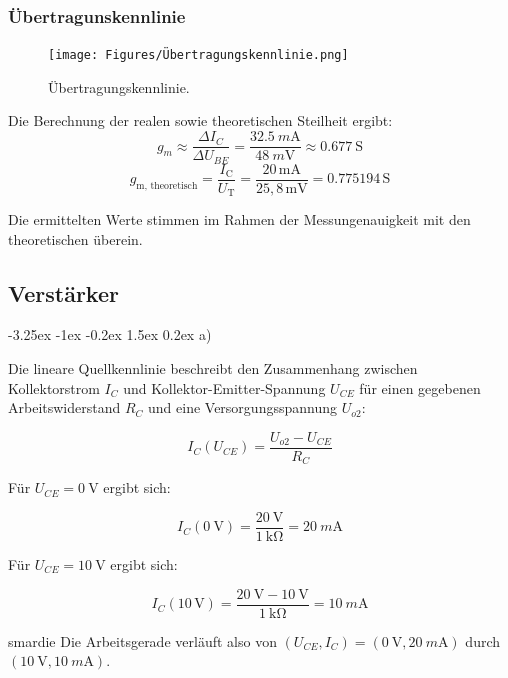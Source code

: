 \documentclass[
	a4paper, %
	12pt, %
]{CSUniSchoolLabReport}
\makeatletter
\renewcommand\paragraph{\@startsection{paragraph}{4}{\z@}%
  {-3.25ex \@plus -1ex \@minus -0.2ex}%
  {1.5ex \@plus 0.2ex}%
  {\normalfont\normalsize\bfseries}}
\newcommand{\milli}{m}
\makeatother
\begin{document}
\subsubsection{Übertragunskennlinie}
\begin{figure}[H]
	\centering
	\texttt{[image: Figures/Übertragungskennlinie.png]}
	\caption{Übertragungskennlinie.}
	\label{fig:Übertragungskennlinie}
\end{figure}

Die Berechnung der realen sowie theoretischen Steilheit ergibt:\\

\[
g_m \approx \frac{\Delta I_C}{\Delta U_{BE}} = \frac{\SI{32.5}{\milli\ampere}}{\SI{48}{\milli\volt}} \approx \SI{0.677}{\siemens}
\]
\[
g_{\text{m, theoretisch}} = \frac{I_{\text{C}}}{U_{\text{T}}} = \frac{20\,\text{mA}}{25,8\,\text{mV}} = 0.775194\,\text{S}
\]

\vspace{2em}
Die ermittelten Werte stimmen im Rahmen der Messungenauigkeit mit den theoretischen überein.

\subsection{Verstärker}
\paragraph{a)}

Die lineare Quellkennlinie beschreibt den Zusammenhang zwischen Kollektorstrom $I_C$ und Kollektor-Emitter-Spannung $U_{CE}$ für einen gegebenen Arbeitswiderstand $R_C$ und eine Versorgungsspannung $U_{o2}$:

\[
I_C(U_{CE}) = \frac{U_{o2} - U_{CE}}{R_C}
\]

Für $U_{CE} = \SI{0}{\volt}$ ergibt sich:

\[
I_C(\SI{0}{\volt}) = \frac{\SI{20}{\volt}}{\SI{1}{\kilo\ohm}} = \SI{20}{\milli\ampere}
\]

Für $U_{CE} = \SI{10}{\volt}$ ergibt sich:

\[
I_C(10\,\mathrm{V}) = \frac{\SI{20}{\volt}- \SI{10}{\volt}}{\SI{1}{\kilo\ohm}} = \SI{10}{\milli\ampere}
\]

\vspace{1em}smardie 
Die Arbeitsgerade verläuft also von $(U_{CE}, I_C) = (\SI{0}{\volt}, \SI{20}{\milli\ampere})$ durch $(\SI{10}{\volt}, \SI{10}{\milli\ampere})$.
\end{document}
